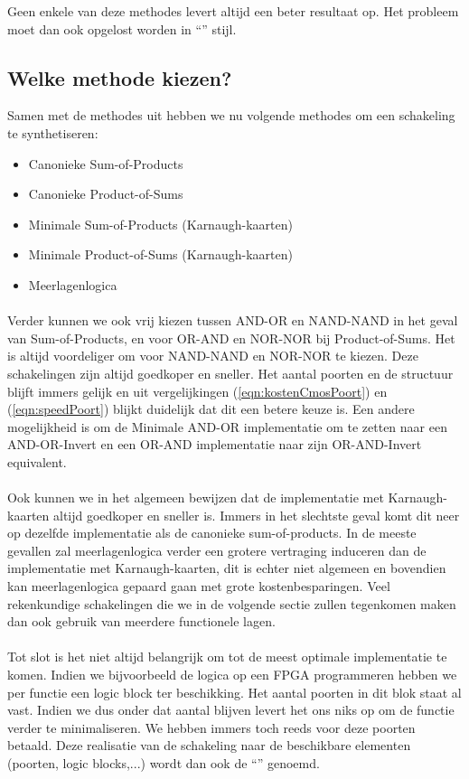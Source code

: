 Geen enkele van deze methodes levert altijd een beter resultaat op. Het probleem moet dan ook opgelost worden in ``'' stijl.
\subsection{Welke methode kiezen?}
Samen met de methodes uit  hebben we nu volgende methodes om een schakeling te synthetiseren:
\begin{itemize}
 \item Canonieke Sum-of-Products
 \item Canonieke Product-of-Sums
 \item Minimale Sum-of-Products (Karnaugh-kaarten)
 \item Minimale Product-of-Sums (Karnaugh-kaarten)
 \item Meerlagenlogica
\end{itemize}
\paragraph{}Verder kunnen we ook vrij kiezen tussen AND-OR en NAND-NAND in het geval van Sum-of-Products, en voor OR-AND en NOR-NOR bij Product-of-Sums. Het is altijd voordeliger om voor NAND-NAND en NOR-NOR te kiezen. Deze schakelingen zijn altijd goedkoper en sneller. Het aantal poorten en de structuur blijft immers gelijk en uit vergelijkingen (\ref{eqn:kostenCmosPoort}) en (\ref{eqn:speedPoort}) blijkt duidelijk dat dit een betere keuze is. Een andere mogelijkheid is om de Minimale AND-OR implementatie om te zetten naar een AND-OR-Invert en een OR-AND implementatie naar zijn OR-AND-Invert equivalent.
\paragraph{}Ook kunnen we in het algemeen bewijzen dat de implementatie met Karnaugh-kaarten altijd goedkoper en sneller is. Immers in het slechtste geval komt dit neer op dezelfde implementatie als de canonieke sum-of-products. In de meeste gevallen zal meerlagenlogica verder een grotere vertraging induceren dan de implementatie met Karnaugh-kaarten, dit is echter niet algemeen en bovendien kan meerlagenlogica gepaard gaan met grote kostenbesparingen. Veel rekenkundige schakelingen die we in de volgende sectie zullen tegenkomen maken dan ook gebruik van meerdere functionele lagen.
\paragraph{}Tot slot is het niet altijd belangrijk om tot de meest optimale implementatie te komen. Indien we bijvoorbeeld de logica op een FPGA programmeren hebben we per functie een logic block ter beschikking. Het aantal poorten in dit blok staat al vast. Indien we dus onder dat aantal blijven levert het ons niks op om de functie verder te minimaliseren. We hebben immers toch reeds voor deze poorten betaald. Deze realisatie van de schakeling naar de beschikbare elementen (poorten, logic blocks,...) wordt dan ook de ``'' genoemd.
